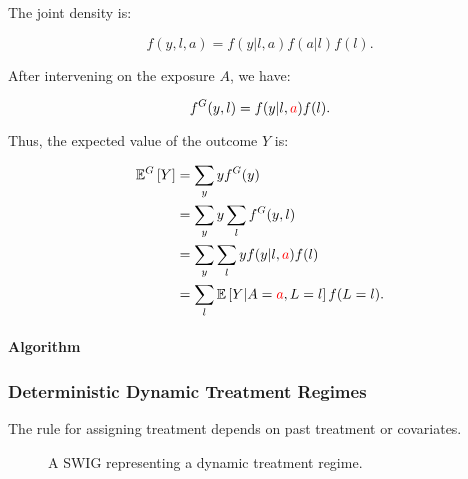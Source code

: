 \documentclass[12pt]{article}
\begin{document}
The joint density is:

\begin{equation}
    f(y,l,a) = f(y|l,a) f(a|l) f(l).
\end{equation}

After intervening on the exposure $A$, we have:

\begin{equation}
    f^G(y,l) = f(y|l,\textcolor{red}{a}) f(l).
\end{equation}

Thus, the expected value of the outcome $Y$ is:

\begin{align}
    \mathbb{E}^G \left[ Y \right] &= \sum_y y f^G(y) \\
    &= \sum_y y \sum_l f^G(y,l) \\
    &= \sum_y \sum_l y f(y|l,\textcolor{red}{a}) f(l) \\
    &= \sum_l \mathbb{E} \left[ Y|A=\textcolor{red}{a},L=l\right] f(L=l).
\end{align}

\paragraph{Algorithm}

\subsubsection*{Deterministic Dynamic Treatment Regimes}
The rule for assigning treatment depends on past treatment or covariates.

\begin{figure}[h]
\centering
{}
\caption{A SWIG representing a dynamic treatment regime.}
\label{fig:swig_det_dyn_inv}
\end{figure}
\end{document}
